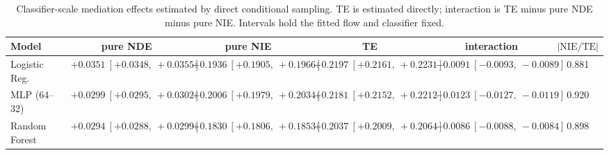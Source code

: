 \begin{table}[htbp]
  \centering
  \caption{Classifier-scale mediation effects estimated by direct conditional sampling. TE is estimated directly; interaction is TE minus pure NDE minus pure NIE. Intervals hold the fitted flow and classifier fixed.}
  \label{tab:german_synth_gap_overall}
  \begin{tabular}{lccccc}
    \toprule
    Model & pure NDE & pure NIE & TE & interaction & $|\mathrm{NIE}/\mathrm{TE}|$ \\
    \midrule
    Logistic Reg. & $+0.0351\ [+0.0348,\ +0.0355]$ & $+0.1936\ [+0.1905,\ +0.1966]$ & $+0.2197\ [+0.2161,\ +0.2231]$ & $-0.0091\ [-0.0093,\ -0.0089]$ & 0.881 \\
    MLP (64--32) & $+0.0299\ [+0.0295,\ +0.0302]$ & $+0.2006\ [+0.1979,\ +0.2034]$ & $+0.2181\ [+0.2152,\ +0.2212]$ & $-0.0123\ [-0.0127,\ -0.0119]$ & 0.920 \\
    Random Forest & $+0.0294\ [+0.0288,\ +0.0299]$ & $+0.1830\ [+0.1806,\ +0.1853]$ & $+0.2037\ [+0.2009,\ +0.2064]$ & $-0.0086\ [-0.0088,\ -0.0084]$ & 0.898 \\
    \bottomrule
  \end{tabular}
\end{table}